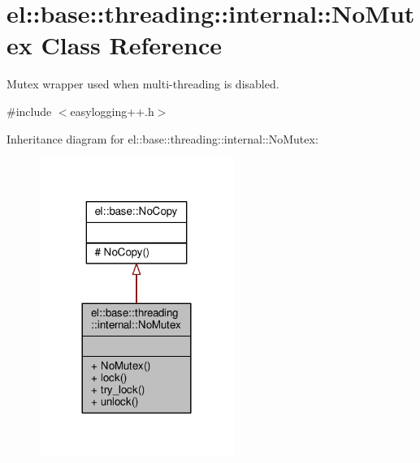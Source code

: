 \hypertarget{classel_1_1base_1_1threading_1_1internal_1_1NoMutex}{}\section{el\+:\+:base\+:\+:threading\+:\+:internal\+:\+:No\+Mutex Class Reference}
\label{classel_1_1base_1_1threading_1_1internal_1_1NoMutex}


Mutex wrapper used when multi-\/threading is disabled.  




{\ttfamily \#include $<$easylogging++.\+h$>$}



Inheritance diagram for el\+:\+:base\+:\+:threading\+:\+:internal\+:\+:No\+Mutex\+:
\nopagebreak
\begin{figure}[H]
\begin{center}
\leavevmode
\includegraphics[width=180pt]{d4/d3d/classel_1_1base_1_1threading_1_1internal_1_1NoMutex__inherit__graph}
\end{center}
\end{figure}


